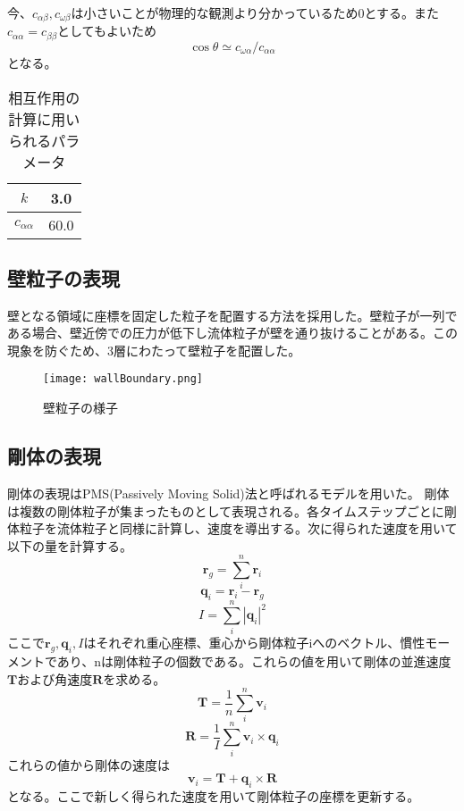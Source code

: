 \documentclass[]{jsarticle}
\begin{document}
今、$c_{\alpha\beta},c_{\omega\beta}$は小さいことが物理的な観測より分かっているため0とする。また$c_{\alpha\alpha}=c_{\beta\beta}$としてもよいため
\begin{equation}
\cos\theta\simeq c_{\omega\alpha}/c_{\alpha\alpha}
\end{equation}
となる。
\begin{table}[h]
  \caption{相互作用の計算に用いられるパラメータ}
  \label{interParam}
  \begin{center}
    \begin{tabular}{|c|c|}\hline
      $k$&3.0 \\ \hline
      $c_{\alpha\alpha}$ & 60.0 \\ \hline
    \end{tabular}
  \end{center}  
\end{table}

\subsection{壁粒子の表現}
壁となる領域に座標を固定した粒子を配置する方法を採用した。壁粒子が一列である場合、壁近傍での圧力が低下し流体粒子が壁を通り抜けることがある。この現象を防ぐため、3層にわたって壁粒子を配置した。
\begin{figure}[H]
  \centering
  \texttt{[image: wallBoundary.png]}
  \caption{壁粒子の様子}
  \label{fig:wallParticles} 
\end{figure}



\subsection{剛体の表現}
剛体の表現はPMS(Passively Moving Solid)法\cite{Gotoh2018}と呼ばれるモデルを用いた。
剛体は複数の剛体粒子が集まったものとして表現される。各タイムステップごとに剛体粒子を流体粒子と同様に計算し、速度を導出する。次に得られた速度を用いて以下の量を計算する。
\begin{equation}
  \bm{r}_g=\sum_{i}^n{\bm{r}_i}
\end{equation}
\begin{equation}
  \bm{q}_i=\bm{r}_i-\bm{r}_g
\end{equation}
\begin{equation}
  I=\sum_{i}^n{|\bm{q}_i|^2}
\end{equation}
ここで$\bm{r}_g,\bm{q}_i,I$はそれぞれ重心座標、重心から剛体粒子iへのベクトル、慣性モーメントであり、nは剛体粒子の個数である。これらの値を用いて剛体の並進速度$\bm{T}$および角速度$\bm{R}$を求める。
\begin{equation}
  \bm{T}=\frac{1}{n}\sum_{i}^n{\bm{v}_i}
\end{equation}
\begin{equation}
  \bm{R}=\frac{1}{I}\sum_{i}^n{\bm{v}_i\times\bm{q}_i}
\end{equation}
これらの値から剛体の速度は
\begin{equation}
\bm{v}_i=\bm{T}+\bm{q}_i\times\bm{R}
\end{equation}
となる。ここで新しく得られた速度を用いて剛体粒子の座標を更新する。
\end{document}
